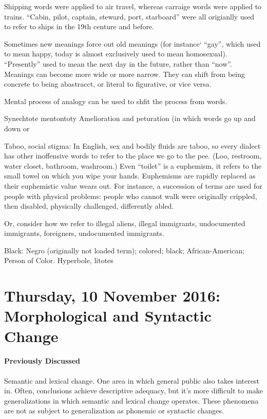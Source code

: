 \documentclass{exam}
\begin{document}
Shipping words were applied to air travel, whereas carraige words were applied to trains. ``Cabin, pilot, captain, steward, port, starboard'' were all origianlly used to refer to ships in the 19th centure and before.

Sometimes new meanings force out old meanings (for instance` ``gay'', which used to mean happy, today is almost exclusively used to mean homosexual).
``Presently'' used to mean the next day in the future, rather than ``now''. 
Meanings can become more wide or more narrow. They can shift from being concrete to being abastracct, or literal to figurative, or vice versa.

Mental process of analogy can be used to shfit the process from words. 

Synechtote mentontoty
Amelioration and peturation (in which words go up and down or 

Taboo, social stigma: In English, sex and bodily fluids are taboo, so every dialect has other inoffensive words to refer to the place we go to the pee. 
(Loo, restroom, water closet, bathroom, washroom.)
Even ``toilet'' is a euphemism, it refers to the small towel on which you wipe your hands. 
Euphemisms are rapidly replaced as their euphemistic value wears out. 
For instance, a succession of terms are used for people with physical problems: people who cannot walk were originally crippled, then disabled, physically challenged, differently abled. 

Or, consider how we refer to illegal aliens, illegal immigrants, undocumented immigrants, foreigners, undocumented immigrants. 

Black: Negro (originally not loaded term); colored; black; African-American; Person of Color. 
Hyperbole, litotes

\section*{Thursday, 10 November 2016: Morphological and Syntactic Change}

\paragraph{Previously Discussed} Semantic and lexical change. 
One area in which general public also takes interest in. 
Often, conclusions achieve descriptive adequacy, but it's more difficult to make generalizations in which semantic and lexical change operates.
These phenomena are not as subject to generalization as phonemic or syntactic changes. 
\end{document}
